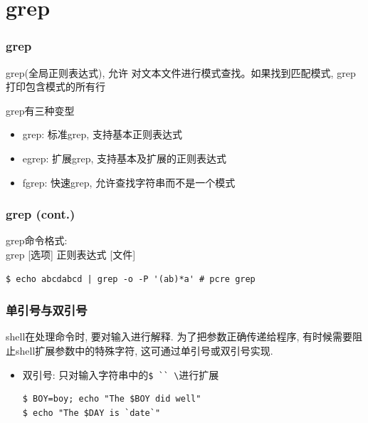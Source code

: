 \documentclass[compress]{beamer}
\begin{document}
\section{grep}

\begin{frame}[fragile]
	\frametitle{grep}

\alert{grep}(全局正则表达式), 允许
对文本文件进行模式查找。如果找到匹配模式,
\alert{grep}打印包含模式的所有行

{grep}有三种变型
\begin{itemize}
\item grep: 标准grep, 支持基本正则表达式
\item egrep: 扩展grep, 支持基本及扩展的正则表达式
\item fgrep: 快速grep, 允许查找字符串而不是一个模式
\end{itemize}


\end{frame}


\begin{frame}[fragile]
	\frametitle{grep (cont.)}
{grep}命令格式:\\
grep [选项] 正则表达式 [文件]

\begin{Verbatim}
$ echo abcdabcd | grep -o -P '(ab)*a' # pcre grep
\end{Verbatim}

\end{frame}

\begin{frame}[fragile]
\frametitle{单引号与双引号}

shell在处理命令时, 要对输入进行解释. 为了把参数正确传递给程序,
有时候需要阻止shell扩展参数中的特殊字符,
这可通过单引号或双引号实现.

\begin{itemize}
\item 双引号: 只对输入字符串中的\verb=$ `` \=进行扩展\\[2em]
\begin{Verbatim}
$ BOY=boy; echo "The $BOY did well"
$ echo "The $DAY is `date`"
\end{Verbatim}

\end{itemize}
\end{frame}
\end{document}
